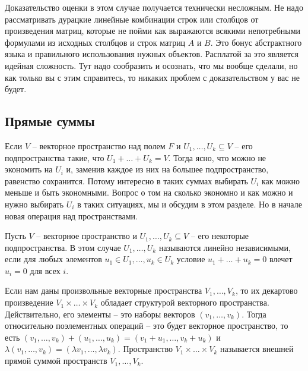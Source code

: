 Доказательство оценки в этом случае получается технически несложным. Не надо рассматривать дурацкие линейные комбинации строк или столбцов от произведения матриц, которые не пойми как выражаются всякими непотребными формулами из исходных столбцов и строк матриц $A$ и $B$. Это бонус абстрактного языка и правильного использования нужных объектов. Расплатой за это является идейная сложность. Тут надо сообразить и осознать, что мы вообще сделали, но как только вы с этим справитесь, то никаких проблем с доказательством у вас не будет.

\subsection{Прямые суммы}

Если $V$ -- векторное пространство над полем $F$ и $U_1,\ldots,U_k\subseteq V$ -- его подпространства такие, что $U_1 + \ldots + U_k = V$. Тогда ясно, что можно не экономить на $U_i$ и, заменив каждое из них на большее подпространство, равенство сохранится. Потому интересно в таких суммах выбирать $U_i$ как можно меньше и быть экономными. Вопрос о том на сколько экономно и как можно и нужно выбирать $U_i$ в таких ситуациях, мы и обсудим в этом разделе. Но в начале новая операция над пространствами.

\begin{definition}
Пусть $V$ -- векторное пространство и $U_1,\ldots,U_k\subseteq V$ -- его некоторые подпространства. В этом случае $U_1,\ldots, U_k$ называются линейно независимыми, если для любых элементов $u_1\in U_1, \ldots, u_k\in U_k$ условие $u_1 + \ldots + u_k = 0$ влечет $u_i = 0$ для всех $i$.
\end{definition}

\begin{definition}
Если нам даны произвольные векторные пространства $V_1,\ldots, V_k$, то их декартово произведение $V_1\times\ldots\times V_k$ обладает структурой векторного пространства. Действительно, его элементы -- это наборы векторов $(v_1,\ldots,v_k)$. Тогда относительно поэлементных операций -- это будет векторное пространство, то есть
$(v_1,\ldots,v_k) + (u_1,\ldots,u_k) = (v_1 + u_1,\ldots,v_k + u_k)$ и $\lambda(v_1,\ldots,v_k) = (\lambda v_1, \ldots, \lambda v_k)$. Пространство $V_1\times\ldots \times V_k$ называется внешней прямой суммой пространств $V_1,\ldots, V_k$.
\end{definition}

